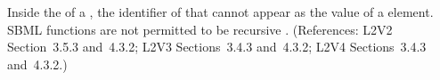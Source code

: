 Inside the  of a \FunctionDefinition, the identifier of that
\FunctionDefinition cannot appear as the value of a  element.  SBML
functions are not permitted to be recursive .
(References: L2V2 Section~3.5.3 and~4.3.2; L2V3 Sections~3.4.3 and~4.3.2;
L2V4 Sections~3.4.3 and~4.3.2.)
